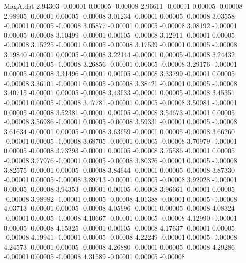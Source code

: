 \begin{filecontents}{MagA.dat}
   2.94303   -0.00001    0.00005   -0.00008
   2.96611   -0.00001    0.00005   -0.00008
   2.98905   -0.00001    0.00005   -0.00008
   3.01234   -0.00001    0.00005   -0.00008
   3.03558   -0.00001    0.00005   -0.00008
   3.05877   -0.00001    0.00005   -0.00008
   3.08192   -0.00001    0.00005   -0.00008
   3.10499   -0.00001    0.00005   -0.00008
   3.12911   -0.00001    0.00005   -0.00008
   3.15225   -0.00001    0.00005   -0.00008
   3.17539   -0.00001    0.00005   -0.00008
   3.19840   -0.00001    0.00005   -0.00008
   3.22144   -0.00001    0.00005   -0.00008
   3.24432   -0.00001    0.00005   -0.00008
   3.26856   -0.00001    0.00005   -0.00008
   3.29176   -0.00001    0.00005   -0.00008
   3.31496   -0.00001    0.00005   -0.00008
   3.33799   -0.00001    0.00005   -0.00008
   3.36101   -0.00001    0.00005   -0.00008
   3.38421   -0.00001    0.00005   -0.00008
   3.40715   -0.00001    0.00005   -0.00008
   3.43033   -0.00001    0.00005   -0.00008
   3.45351   -0.00001    0.00005   -0.00008
   3.47781   -0.00001    0.00005   -0.00008
   3.50081   -0.00001    0.00005   -0.00008
   3.52381   -0.00001    0.00005   -0.00008
   3.54673   -0.00001    0.00005   -0.00008
   3.56986   -0.00001    0.00005   -0.00008
   3.59331   -0.00001    0.00005   -0.00008
   3.61634   -0.00001    0.00005   -0.00008
   3.63959   -0.00001    0.00005   -0.00008
   3.66260   -0.00001    0.00005   -0.00008
   3.68705   -0.00001    0.00005   -0.00008
   3.70979   -0.00001    0.00005   -0.00008
   3.73293   -0.00001    0.00005   -0.00008
   3.75586   -0.00001    0.00005   -0.00008
   3.77976   -0.00001    0.00005   -0.00008
   3.80326   -0.00001    0.00005   -0.00008
   3.82575   -0.00001    0.00005   -0.00008
   3.84944   -0.00001    0.00005   -0.00008
   3.87330   -0.00001    0.00005   -0.00008
   3.89713   -0.00001    0.00005   -0.00008
   3.92028   -0.00001    0.00005   -0.00008
   3.94353   -0.00001    0.00005   -0.00008
   3.96661   -0.00001    0.00005   -0.00008
   3.98982   -0.00001    0.00005   -0.00008
   4.01388   -0.00001    0.00005   -0.00008
   4.03713   -0.00001    0.00005   -0.00008
   4.05996   -0.00001    0.00005   -0.00008
   4.08324   -0.00001    0.00005   -0.00008
   4.10667   -0.00001    0.00005   -0.00008
   4.12990   -0.00001    0.00005   -0.00008
   4.15325   -0.00001    0.00005   -0.00008
   4.17637   -0.00001    0.00005   -0.00008
   4.19941   -0.00001    0.00005   -0.00008
   4.22249   -0.00001    0.00005   -0.00008
   4.24573   -0.00001    0.00005   -0.00008
   4.26880   -0.00001    0.00005   -0.00008
   4.29286   -0.00001    0.00005   -0.00008
   4.31589   -0.00001    0.00005   -0.00008

\end{filecontents}

